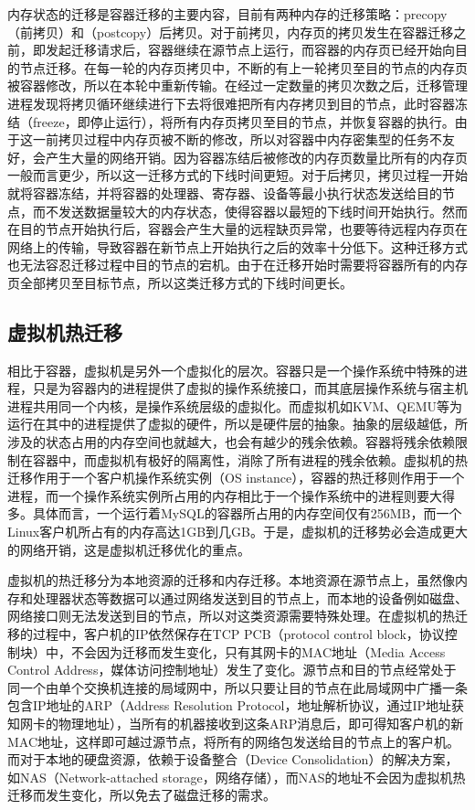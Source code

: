 内存状态的迁移是容器迁移的主要内容，目前有两种内存的迁移策略：precopy（前拷贝）和（postcopy）后拷贝。对于前拷贝，内存页的拷贝发生在容器迁移之前，即发起迁移请求后，容器继续在源节点上运行，而容器的内存页已经开始向目的节点迁移。在每一轮的内存页拷贝中，不断的有上一轮拷贝至目的节点的内存页被容器修改，所以在本轮中重新传输。在经过一定数量的拷贝次数之后，迁移管理进程发现将拷贝循环继续进行下去将很难把所有内存拷贝到目的节点，此时容器冻结（freeze，即停止运行），将所有内存页拷贝至目的节点，并恢复容器的执行。由于这一前拷贝过程中内存页被不断的修改，所以对容器中内存密集型的任务不友好，会产生大量的网络开销。因为容器冻结后被修改的内存页数量比所有的内存页一般而言更少，所以这一迁移方式的下线时间更短。对于后拷贝，拷贝过程一开始就将容器冻结，并将容器的处理器、寄存器、设备等最小执行状态发送给目的节点，而不发送数据量较大的内存状态，使得容器以最短的下线时间开始执行。然而在目的节点开始执行后，容器会产生大量的远程缺页异常，也要等待远程内存页在网络上的传输，导致容器在新节点上开始执行之后的效率十分低下。这种迁移方式也无法容忍迁移过程中目的节点的宕机。由于在迁移开始时需要将容器所有的内存页全部拷贝至目标节点，所以这类迁移方式的下线时间更长。

\subsection{虚拟机热迁移}
相比于容器，虚拟机是另外一个虚拟化的层次。容器只是一个操作系统中特殊的进程，只是为容器内的进程提供了虚拟的操作系统接口，而其底层操作系统与宿主机进程共用同一个内核，是操作系统层级的虚拟化。而虚拟机如KVM、QEMU等为运行在其中的进程提供了虚拟的硬件，所以是硬件层的抽象。抽象的层级越低，所涉及的状态占用的内存空间也就越大，也会有越少的残余依赖。容器将残余依赖限制在容器中，而虚拟机有极好的隔离性，消除了所有进程的残余依赖。虚拟机的热迁移作用于一个客户机操作系统实例（OS instance），容器的热迁移则作用于一个进程，而一个操作系统实例所占用的内存相比于一个操作系统中的进程则要大得多。具体而言，一个运行着MySQL的容器所占用的内存空间仅有256MB\cite{Voyager}，而一个Linux客户机所占有的内存高达1GB到几GB。于是，虚拟机的迁移势必会造成更大的网络开销，这是虚拟机迁移优化的重点。

虚拟机的热迁移\cite{livemigration}分为本地资源的迁移和内存迁移。本地资源在源节点上，虽然像内存和处理器状态等数据可以通过网络发送到目的节点上，而本地的设备例如磁盘、网络接口则无法发送到目的节点，所以对这类资源需要特殊处理。在虚拟机的热迁移的过程中，客户机的IP依然保存在TCP PCB（protocol control block，协议控制块）中，不会因为迁移而发生变化，只有其网卡的MAC地址（Media Access Control Address，媒体访问控制地址）发生了变化。源节点和目的节点经常处于同一个由单个交换机连接的局域网中，所以只要让目的节点在此局域网中广播一条包含IP地址的ARP（Address Resolution Protocol，地址解析协议，通过IP地址获知网卡的物理地址），当所有的机器接收到这条ARP消息后，即可得知客户机的新MAC地址，这样即可越过源节点，将所有的网络包发送给目的节点上的客户机。而对于本地的硬盘资源，依赖于设备整合（Device Consolidation）的解决方案，如NAS（Network-attached storage，网络存储），而NAS的地址不会因为虚拟机热迁移而发生变化，所以免去了磁盘迁移的需求。

